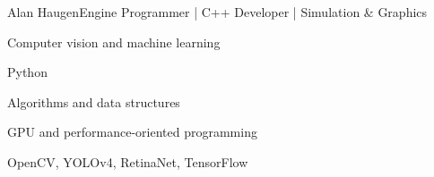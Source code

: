 \documentclass{article}
\begin{document}
\begin{cv}[avatar]{Alan Haugen}{Engine Programmer | C++ Developer | Simulation \& Graphics}
\cvseparator

\begin{cvitem}
    Computer vision and machine learning
\end{cvitem}

\cvseparator

\begin{cvitem}
    Python
\end{cvitem}

\cvseparator

\begin{cvitem}
    Algorithms and data structures
\end{cvitem}

\cvseparator

\begin{cvitem}
    GPU and performance-oriented programming
\end{cvitem}

\cvseparator

\begin{cvitem}
    OpenCV, YOLOv4, RetinaNet, TensorFlow
\end{cvitem}



\end{cv}
\end{document}
